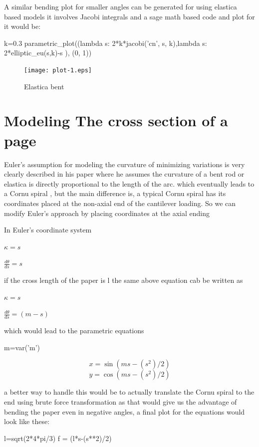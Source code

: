 \documentclass[longbibliography]{revtex4-1}
\begin{document}
A similar bending plot for smaller angles can be generated for using elastica based models it involves Jacobi integrals and a sage math based code and plot for it would be:

\begin{sageblock}
k=0.3
parametric_plot((lambda s: 2*k*jacobi('cn', s, k),lambda s: 2*elliptic_eu(s,k)-s ), (0, 1))
\end{sageblock}

\begin{figure}
\centering
\texttt{[image: plot-1.eps]}
\caption{Elastica bent}
\end{figure}

\section{Modeling The cross section of a page}

Euler's assumption for modeling the curvature of minimizing variations is very clearly described in his paper where he assumes the curvature of a bent rod or elastica is directly proportional to the length of the arc. which eventually leads to a Cornu spiral , but the main difference is, a typical Cornu spiral has its coordinates placed at the non-axial end of the cantilever loading. So we can modify Euler's approach by placing coordinates at the axial ending

In Euler's coordinate system

$\kappa=s$

$\frac{d\theta}{ds} =s$


if the cross length of the paper is l the same above equation cab be written as

$\kappa=s$

$\frac{d\theta}{ds} =(m-s)$

which would lead to the parametric equations 

\begin{sagesilent}
m=var('m')
\end{sagesilent}

\[
x=\sin(ms-(s^2)/2)
\]
\[
y=\cos(ms-(s^2)/2)
\]

a better way to handle this would be to actually translate the Cornu spiral to the end using brute force transformation as that would give us the advantage of bending the paper even in negative angles, a final plot for the equations would look like these:

\begin{sagesilent}
l=sqrt(2*4*pi/3)
f = (l*s-(s**2)/2)
\end{sagesilent}
\end{document}
